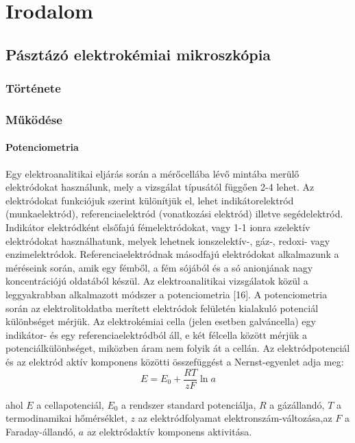 \chapter{Irodalom}
\pagestyle{headings}
\section{Pásztázó elektrokémiai mikroszkópia}
\subsection{Története}
\subsection{Működése}
\subsubsection{Potenciometria}
Egy elektroanalitikai eljárás során a mérőcellába lévő mintába merülő elektródokat használunk, mely a vizsgálat típusától függően 2-4 lehet. Az elektródokat funkciójuk szerint különítjük el, lehet indikátorelektród (munkaelektród), referenciaelektród (vonatkozási elektród) illetve segédelektród. Indikátor elektródként elsőfajú fémelektródokat, vagy 1-1 ionra szelektív elektródokat használhatunk, melyek lehetnek ionszelektív-, gáz-, redoxi- vagy enzimelektródok. Referenciaelektródnak másodfajú elektródokat alkalmazunk a méréseink során, amik egy fémből, a fém sójából és a só anionjának nagy koncentrációjú oldatából készül.
Az elektroanalitikai vizsgálatok közül a leggyakrabban alkalmazott módszer a potenciometria [16]. A potenciometria során az elektrolitoldatba merített elektródok felületén kialakuló potenciál különbséget mérjük. Az elektrokémiai cella (jelen esetben galváncella) egy indikátor- és egy referenciaelektródból áll, e két félcella között mérjük a potenciálkülönbséget, miközben áram nem folyik át a cellán. Az elektródpotenciál és az elektród aktív komponens közötti összefüggést a Nernst-egyenlet adja meg: 
\begin{equation}
E = E_\text{0} + \frac{RT}{zF} \ln a
\end{equation}

ahol $E$ a cellapotenciál, $E_\text{0}$ a rendszer standard potenciálja, $R$ a gázállandó, $T$ a termodinamikai hőmérséklet, $z$ az elektródfolyamat elektronszám-változása,az $F$ a Faraday-állandó, $a$ az elektródaktív komponens aktivitása.

